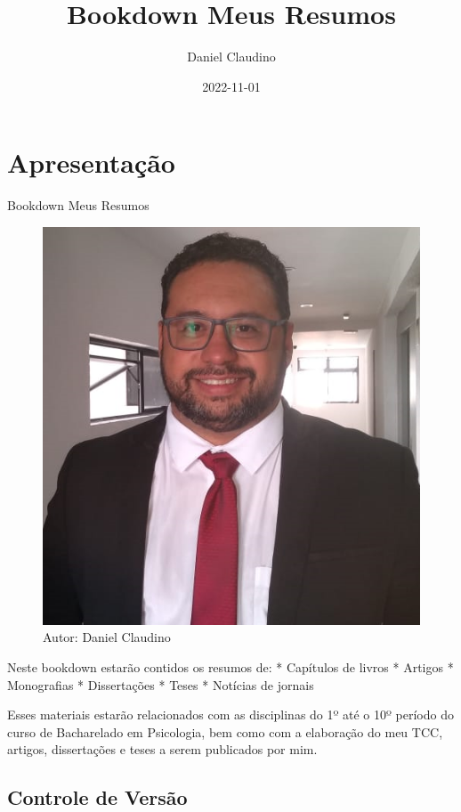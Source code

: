 \documentclass[
]{book}
\title{Bookdown Meus Resumos}
\author{Daniel Claudino}
\date{2022-11-01}
\begin{document}
\maketitle

{
\setcounter{tocdepth}{1}
\tableofcontents
}
\hypertarget{apresentauxe7uxe3o}{%
\chapter{Apresentação}\label{apresentauxe7uxe3o}}

Bookdown Meus Resumos

\begin{figure}

{\centering \includegraphics[width=0.5\linewidth]{imagens/FOTO-PERFIL-DANIEL-CLAUDINO-2020} 

}

\caption{Autor: Daniel Claudino}\label{fig:unnamed-chunk-1}
\end{figure}

Neste bookdown estarão contidos os resumos de:
* Capítulos de livros
* Artigos
* Monografias
* Dissertações
* Teses
* Notícias de jornais

Esses materiais estarão relacionados com as disciplinas do 1º até o 10º período do curso de Bacharelado em Psicologia, bem como com a elaboração do meu TCC, artigos, dissertações e teses a serem publicados por mim.

\hypertarget{controle-de-versuxe3o}{%
\section{Controle de Versão}\label{controle-de-versuxe3o}}
\end{document}
